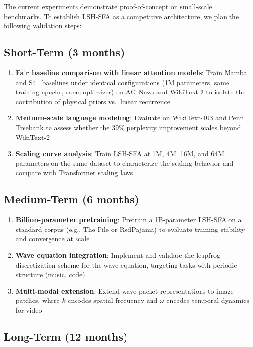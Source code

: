 \documentclass{article}
\begin{document}
The current experiments demonstrate proof-of-concept on small-scale benchmarks. To establish LSH-SFA as a competitive architecture, we plan the following validation steps:

\subsection{Short-Term (3 months)}

\begin{enumerate}
\item \textbf{Fair baseline comparison with linear attention models}: Train Mamba~\citep{gu2023mamba} and S4~\citep{gu2021efficiently} baselines under identical configurations (1M parameters, same training epochs, same optimizer) on AG News and WikiText-2 to isolate the contribution of physical priors vs.\ linear recurrence
\item \textbf{Medium-scale language modeling}: Evaluate on WikiText-103 and Penn Treebank to assess whether the 39\% perplexity improvement scales beyond WikiText-2
\item \textbf{Scaling curve analysis}: Train LSH-SFA at 1M, 4M, 16M, and 64M parameters on the same dataset to characterize the scaling behavior and compare with Transformer scaling laws
\end{enumerate}

\subsection{Medium-Term (6 months)}

\begin{enumerate}
\item \textbf{Billion-parameter pretraining}: Pretrain a 1B-parameter LSH-SFA on a standard corpus (e.g., The Pile or RedPajama) to evaluate training stability and convergence at scale
\item \textbf{Wave equation integration}: Implement and validate the leapfrog discretization scheme for the wave equation, targeting tasks with periodic structure (music, code)
\item \textbf{Multi-modal extension}: Extend wave packet representations to image patches, where $k$ encodes spatial frequency and $\omega$ encodes temporal dynamics for video
\end{enumerate}

\subsection{Long-Term (12 months)}
\end{document}

